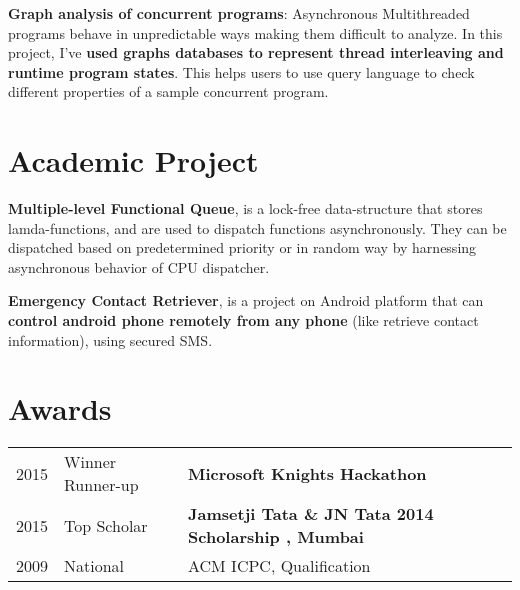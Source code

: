 \documentclass[letterpaper]{kishore-resume} %
\begin{document}
\begin{minipage}[t]{0.66\textwidth}
\sectionspace %


\begin{tightitemize}
\item \textbf{Graph analysis of concurrent programs}: 
Asynchronous Multithreaded programs behave in unpredictable ways making them difficult to 
analyze. In this project, I've \textbf{used graphs databases to represent thread interleaving and runtime program states}. This helps users to use query language to check different properties of a sample concurrent program. 
\end{tightitemize}



\section{Academic Project}

\sectionspace %


\begin{tightitemize}
\item \textbf{Multiple-level Functional Queue}, is a lock-free data-structure that stores lamda-functions, and are used to dispatch functions asynchronously. They can be dispatched based on predetermined priority or in random way by harnessing asynchronous behavior of CPU dispatcher. 
\item \textbf{Emergency Contact Retriever}, is a project on Android platform that can \textbf{control android phone
remotely from any phone} (like retrieve contact information), using secured SMS.

\end{tightitemize}


\section{Awards} 

\begin{tabular}{rll}
2015         & Winner Runner-up & \textbf{Microsoft Knights Hackathon}\\
2015	 & Top Scholar & \textbf{Jamsetji Tata  \& JN Tata 2014 Scholarship , Mumbai}\\
2009	 & National & ACM ICPC, Qualification\\
\end{tabular}


\end{minipage}
\end{document}
